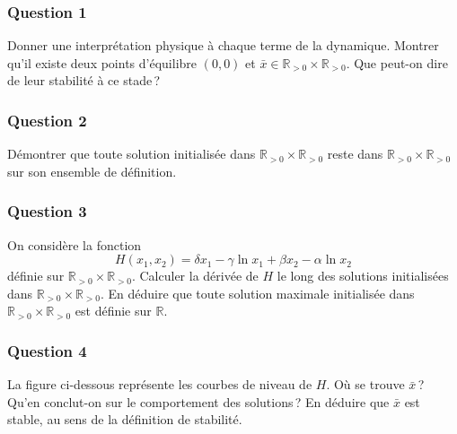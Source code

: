 \hypertarget{cycle-lim-volterra-1}{%
\subsubsection*{Question 1}\label{cycle-lim-volterra-1}}


Donner une interprétation physique à chaque terme de la dynamique.
Montrer qu'il existe deux points d'équilibre \((0,0)\) et
\(\bar{x}\in \mathbb{R}_{> 0}\times\mathbb{R}_{> 0}\). Que peut-on dire
de leur stabilité à ce stade\,?

\hypertarget{cycle-lim-volterra-2}{%
\subsubsection*{Question 2}\label{cycle-lim-volterra-2}}


Démontrer que toute solution initialisée dans
\(\mathbb{R}_{> 0}\times\mathbb{R}_{> 0}\) reste dans
\(\mathbb{R}_{> 0}\times\mathbb{R}_{> 0}\) sur son ensemble de
définition.

\hypertarget{cycle-lim-volterra-3}{%
\subsubsection*{Question 3}\label{cycle-lim-volterra-3}}


On considère la fonction \[
H(x_1,x_2) = \delta x_1 - \gamma \ln x_1 + \beta x_2 - \alpha \ln x_2  
\] définie sur \(\mathbb{R}_{> 0}\times \mathbb{R}_{> 0}\). Calculer la
dérivée de \(H\) le long des solutions initialisées dans
\(\mathbb{R}_{> 0}\times \mathbb{R}_{> 0}\). En déduire que toute
solution maximale initialisée dans
\(\mathbb{R}_{> 0}\times \mathbb{R}_{> 0}\) est définie sur
\(\mathbb{R}\).

\hypertarget{cycle-lim-volterra-4}{%
\subsubsection*{Question 4}\label{cycle-lim-volterra-4}}


La figure ci-dessous représente les courbes de niveau de \(H\). Où se
trouve \(\bar{x}\)\,? Qu'en conclut-on sur le comportement des
solutions\,? En déduire que \(\bar{x}\) est stable, au sens de la
définition de stabilité.

